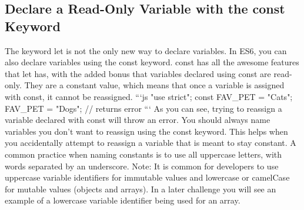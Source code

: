 \documentclass{article}%
\begin{document}
%
\subsection{Declare a Read{-}Only Variable with the const Keyword}%
\label{subsec:DeclareaRead{-}OnlyVariablewiththeconstKeyword}%
The keyword let is not the only new way to declare variables. In ES6, you can also declare variables using the const keyword.\newline%
const has all the awesome features that let has, with the added bonus that variables declared using const are read{-}only. They are a constant value, which means that once a variable is assigned with const, it cannot be reassigned.\newline%
```js\newline%
"use strict";\newline%
const FAV\_PET = "Cats";\newline%
FAV\_PET = "Dogs"; // returns error\newline%
```\newline%
As you can see, trying to reassign a variable declared with const will throw an error. You should always name variables you don't want to reassign using the const keyword. This helps when you accidentally attempt to reassign a variable that is meant to stay constant. A common practice when naming constants is to use all uppercase letters, with words separated by an underscore.\newline%
  Note: It is common for developers to use uppercase variable identifiers for immutable values and lowercase or camelCase for mutable values (objects and arrays). In a later challenge you will see an example of a lowercase variable identifier being used for an array.\newline%

%
\end{document}
